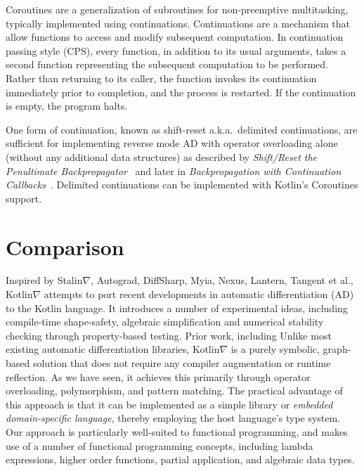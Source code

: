 \documentclass[12pt,initial,twoside,maitrise]{dms}
\numberwithin{equation}{section}
\numberwithin{table}{chapter}
\numberwithin{figure}{chapter}
\begin{document}
Coroutines are a generalization of subroutines for non-preemptive multitasking, typically implemented using continuations. Continuations are a mechanism that allow functions to access and modify subsequent computation. In continuation passing style (CPS), every function, in addition to its usual arguments, takes a second function representing the subsequent computation to be performed. Rather than returning to its caller, the function invokes its continuation immediately prior to completion, and the process is restarted. If the continuation is empty, the program halts.

One form of continuation, known as shift-reset a.k.a.\ delimited continuations, are sufficient for implementing reverse mode AD with operator overloading alone (without any additional data structures) as described by \textit{Shift/Reset the Penultimate Backpropagator}~\citep{wang2018demystifying} and later in \textit{Backpropagation with Continuation Callbacks}~\citep{wang2018backpropagation}. Delimited continuations can be implemented with Kotlin's Coroutines support.

\section{Comparison}\label{sec:comparison}

Inspired by Stalin$\nabla$, Autograd, DiffSharp, Myia, Nexus, Lantern, Tangent et al., Kotlin$\nabla$ attempts to port recent developments in automatic differentiation (AD) to the Kotlin language. It introduces a number of experimental ideas, including compile-time shape-safety, algebraic simplification and numerical stability checking through property-based testing. Prior work, including Unlike most existing automatic differentiation libraries, Kotlin$\nabla$ is a purely symbolic, graph-based solution that does not require any compiler augmentation or runtime reflection. As we have seen, it achieves this primarily through operator overloading, polymorphism, and pattern matching. The practical advantage of this approach is that it can be implemented as a simple library or \textit{embedded domain-specific language}, thereby employing the host language's type system. Our approach is particularly well-suited to functional programming, and makes use of a number of functional programming concepts, including lambda expressions, higher order functions, partial application, and algebraic data types. \\
\end{document}
